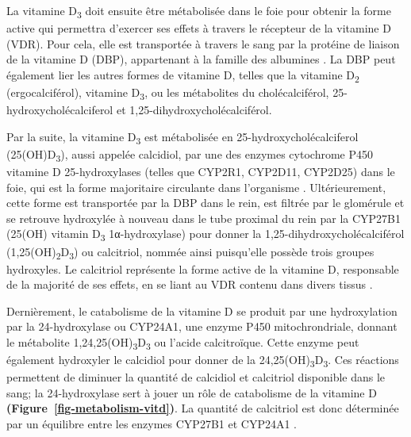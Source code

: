 \documentclass[
  a4paper,
  DIV=11,
  numbers=noendperiod,
  listof=totoc]{scrreprt}
\begin{document}
La vitamine D\textsubscript{3} doit ensuite être métabolisée dans le
foie pour obtenir la forme active qui permettra d'exercer ses effets à
travers le récepteur de la vitamine D (VDR). Pour cela, elle est
transportée à travers le sang par la protéine de liaison de la vitamine
D (DBP), appartenant à la famille des albumines
\autocite{Christakos.2010,Chun.2012}. La DBP peut également lier les
autres formes de vitamine D, telles que la vitamine D\textsubscript{2}
(ergocalciférol), vitamine D\textsubscript{3}, ou les métabolites du
cholécalciférol, 25-hydroxycholécalciferol et
1,25-dihydroxycholécalciférol.

Par la suite, la vitamine D\textsubscript{3} est métabolisée en
25-hydroxycholécalciferol (25(OH)D\textsubscript{3}), aussi appelée
calcidiol, par une des enzymes cytochrome P450 vitamine D
25-hydroxylases (telles que CYP2R1, CYP2D11, CYP2D25) dans le foie, qui
est la forme majoritaire circulante dans l'organisme
\autocite{Norman.2008,Christakos.2010}. Ultérieurement, cette forme est
transportée par la DBP dans le rein, est filtrée par le glomérule et se
retrouve hydroxylée à nouveau dans le tube proximal du rein par la
CYP27B1 (25(OH) vitamin D\textsubscript{3} 1α-hydroxylase) pour donner
la 1,25-dihydroxycholécalciférol
(1,25(OH)\textsubscript{2}D\textsubscript{3}) ou calcitriol, nommée
ainsi puisqu'elle possède trois groupes hydroxyles. Le calcitriol
représente la forme active de la vitamine D, responsable de la majorité
de ses effets, en se liant au VDR contenu dans divers tissus
\autocite{Norman.2008,Dankers.2017}.

Dernièrement, le catabolisme de la vitamine D se produit par une
hydroxylation par la 24-hydroxylase ou CYP24A1, une enzyme P450
mitochrondriale, donnant le métabolite
1,24,25(OH)\textsubscript{3}D\textsubscript{3} ou l'acide calcitroïque.
Cette enzyme peut également hydroxyler le calcidiol pour donner de la
24,25(OH)\textsubscript{3}D\textsubscript{3}. Ces réactions permettent
de diminuer la quantité de calcidiol et calcitriol disponible dans le
sang; la 24-hydroxylase sert à jouer un rôle de catabolisme de la
vitamine D \autocite{Norman.2008}
\textbf{(Figure~\ref{fig-metabolism-vitd})}. La quantité de calcitriol
est donc déterminée par un équilibre entre les enzymes CYP27B1 et
CYP24A1 \autocite{Dankers.2017}.
\end{document}
